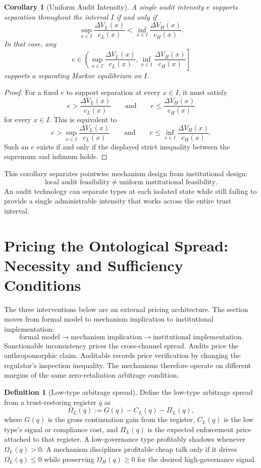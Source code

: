 \documentclass[review,authoryear]{elsarticle}
\newtheorem{corollary}{Corollary}
\theoremstyle{definition}
\newtheorem{definition}{Definition}
\theoremstyle{plain}
\begin{document}
\begin{corollary}[Uniform Audit Intensity]
\label{cor:uniform-audit-intensity}
A single audit intensity $e$ supports separation throughout the interval $I$
if and only if
\[
\sup_{x\in I}
\frac{\Delta V_L(x)}{c_L(x)}
<
\inf_{x\in I}
\frac{\Delta V_H(x)}{c_H(x)}.
\]
In that case, any
\[
e\in
\left(
\sup_{x\in I}\frac{\Delta V_L(x)}{c_L(x)},
\inf_{x\in I}\frac{\Delta V_H(x)}{c_H(x)}
\right]
\]
supports a separating Markov equilibrium on $I$.
\end{corollary}
\begin{proof}
For a fixed $e$ to support separation at every $x\in I$, it must satisfy
\[
e>
\frac{\Delta V_L(x)}{c_L(x)}
\qquad\text{and}\qquad
e\le
\frac{\Delta V_H(x)}{c_H(x)}
\]
for every $x\in I$.  This is equivalent to
\[
e>
\sup_{x\in I}
\frac{\Delta V_L(x)}{c_L(x)}
\qquad\text{and}\qquad
e\le
\inf_{x\in I}
\frac{\Delta V_H(x)}{c_H(x)}.
\]
Such an $e$ exists if and only if the displayed strict inequality between the
supremum and infimum holds.
\end{proof}

This corollary separates pointwise mechanism design from institutional design:
\[
\text{local audit feasibility}
\neq
\text{uniform institutional feasibility}.
\]
An audit technology can separate types at each isolated state while still
failing to provide a single administrable intensity that works across the
entire trust interval.
\section{Pricing the Ontological Spread: Necessity and Sufficiency Conditions}
\label{sec:mechanism}

The three interventions below are an external pricing architecture.  The
section moves from formal model to mechanism implication to institutional
implementation:
\[
\text{formal model}
\to
\text{mechanism implication}
\to
\text{institutional implementation}.
\]
Sanctionable inconsistency prices the cross-channel spread.  Audits price the
anthropomorphic claim.  Auditable records price verification by changing the
regulator's inspection inequality.  The mechanisms therefore operate on
different margins of the same zero-retaliation arbitrage condition.

\begin{definition}[Low-type arbitrage spread]
\label{def:arbitrage-spread}
Define the low-type arbitrage spread from a trust-restoring register $q$ as
\[
\Omega_L(q)
  := G(q)-C_L(q)-\Pi_L(q),
\]
where $G(q)$ is the gross continuation gain from the register,
$C_L(q)$ is the low type's signal or compliance cost, and
$\Pi_L(q)$ is the expected enforcement price attached to that register.
A low-governance type profitably shadows whenever $\Omega_L(q)>0$.
A mechanism disciplines profitable cheap talk only if it drives
$\Omega_L(q)\le 0$ while preserving $\Omega_H(q)\ge 0$ for the desired
high-governance signal.
\end{definition}
\end{document}

